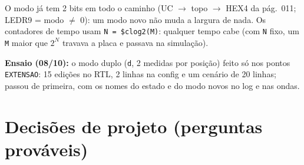 \documentclass[9pt,a4paper]{extarticle}
\newcommand{\s}[1]{\texttt{#1}}          %
\begin{document}
O modo já tem 2 bits em todo o caminho (UC $\to$ topo $\to$ HEX4 da pág.\ 011;
LEDR9 = modo $\neq$ 0): um modo novo não muda a largura de nada. Os contadores de
tempo usam \s{N = \$clog2(M)}: qualquer tempo cabe (com \s{N} fixo, um \s{M} maior
que $2^N$ travava a placa e passava na simulação).

\textbf{Ensaio (08/10):} o modo duplo (\s{d}, 2 medidas por posição) feito só nos
pontos \s{EXTENSAO}: 15 edições no RTL, 2 linhas na config e um cenário de
20 linhas; passou de primeira, com os nomes do estado e do modo novos no log e
nas ondas.

\section{Decisões de projeto (perguntas prováveis)}
\end{document}
